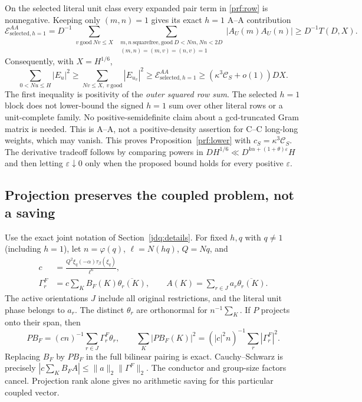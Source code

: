 On the selected literal unit class every expanded pair term in
\eqref{prf:row} is nonnegative. Keeping only $(m,n)=1$ gives its exact
$h=1$ A--A contribution
\[
 \mathcal E^{AA}_{\mathrm{selected},h=1}
 =D^{-1}\sum_{\substack{v\ \mathrm{good}\ Nv\le X}}
  \sum_{\substack{m,n\ \mathrm{squarefree,good}\ D<Nm,Nn<2D\\
                   (m,n)=(m,v)=(n,v)=1}}|A_U(m)A_U(n)|
 \ge D^{-1}T(D,X).
\]
Consequently, with $X=H^{1/6}$,
\[
 \sum_{0<Nu\le H}|E_u|^2
 \ge\sum_{Nv\le X,\ v\ \mathrm{good}}|E_{u_v}|^2
 \ge\mathcal E^{AA}_{\mathrm{selected},h=1}
 \ge(\kappa^3\mathcal C_S+o(1))DX.
\]
The first inequality is positivity of the \emph{outer squared row sum}.
The selected $h=1$ block does not lower-bound the signed $h=1$ sum over
other literal rows or a unit-complete family. No positive-semidefinite
claim about a gcd-truncated Gram matrix is needed. This is A--A, not a
positive-density assertion for C--C long-long weights, which may vanish.
This proves Proposition~\ref{prf:lower} with $c_S=\kappa^3\mathcal C_S$.
The derivative tradeoff follows by comparing powers in
$DH^{1/6}\ll D^{k\alpha+(1+\theta)\varepsilon}H$ and then letting
$\varepsilon\downarrow0$ only when the proposed bound holds for every
positive $\varepsilon$.

\subsection{Projection preserves the coupled problem, not a saving}
Use the exact joint notation of Section~\ref{jdq:details}. For fixed
$h,q$ with $q\ne1$ (including $h=1$), let $n=\varphi(q)$, $\ell=N(hq)$, $Q=Nq$, and
\begin{align*}
 c&=\frac{Q^2\xi_q(-\alpha)\tau_\beta(\xi_q)}{\ell^6},\\
 \Gamma_r^F&=c\sum_K B_F(K)\overline{\theta_r(K)},\qquad
 A(K)=\sum_{r\in J}a_r\overline{\theta_r(K)}.
\end{align*}
The active orientations $J$ include all original restrictions, and the
literal unit phase belongs to $a_r$. The distinct $\theta_r$ are
orthonormal for $n^{-1}\sum_K$. If $P$ projects onto their span, then
\[
 PB_F=(cn)^{-1}\sum_{r\in J}\Gamma_r^F\theta_r,\qquad
 \sum_K|PB_F(K)|^2=(|c|^2n)^{-1}\sum_r|\Gamma_r^F|^2.
\]
Replacing $B_F$ by $PB_F$ in the full bilinear pairing is exact.
Cauchy--Schwarz is precisely
$|c\sum_KB_FA|\le\|a\|_2\|\Gamma^F\|_2$.
The conductor and group-size factors cancel. Projection rank alone gives
no arithmetic saving for this particular coupled vector.

